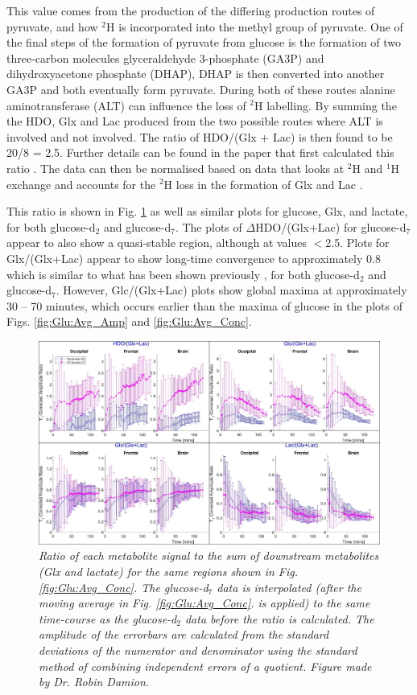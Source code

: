 This value comes from the production of the differing production routes of pyruvate, and how $^2$H is incorporated into the methyl group of pyruvate. One of the final steps of the formation of pyruvate from glucose is the formation of two three-carbon molecules glyceraldehyde 3-phosphate (GA3P) and dihydroxyacetone phosphate (DHAP), DHAP is then converted into another GA3P and both eventually form pyruvate. During both of these routes alanine aminotransferase (ALT) can influence the loss of $^2$H labelling. By summing the the \ac{HDO}, Glx and Lac produced from the two possible routes where ALT is involved and not involved. The ratio of HDO/(Glx + Lac) is then found to be 20/8 = 2.5. Further details can be found in the paper that first calculated this ratio \cite{Mahar2021DeuteratedGlucose}. The data can then be normalised based on data that looks at $^2$H and $^1$H exchange and accounts for the $^2$H loss in the formation of Glx and Lac \cite{DeGraaf2021CharacterizationStudies}.

This ratio is shown in Fig. \ref{fig:Glu:HDO_Rat} as well as similar plots for glucose, Glx, and lactate, for both glucose-d$_2$ and glucose-d$_7$. The plots of $\Delta$HDO/(Glx+Lac) for glucose-d$_7$ appear to also show a quasi-stable region, although at values $<$2.5. Plots for Glx/(Glx+Lac) appear to show long-time convergence to approximately 0.8 which is similar to what has been shown previously \cite{Kaggie2022DeuteriumMetabolism}, for both glucose-d$_2$ and glucose-d$_7$. However, Glc/(Glx+Lac) plots show global maxima at approximately 30 – 70 minutes, which occurs earlier than the maxima of glucose in the plots of Figs. \ref{fig:Glu:Avg_Amp} and \ref{fig:Glu:Avg_Conc}.  

\begin{figure}
    \centering
    \includegraphics[width = 1\textwidth]{Figures/Glucose/HDO_Ratio.png}
    \caption{\textit{Ratio of each metabolite signal to the sum of downstream metabolites (Glx and lactate) for the same regions shown in Fig. \ref{fig:Glu:Avg_Conc}. The glucose-d$_7$ data is interpolated (after the moving average in Fig. \ref{fig:Glu:Avg_Conc}. is applied) to the same time-course as the glucose-d$_2$ data before the ratio is calculated. The amplitude of the errorbars are calculated from the standard deviations of the numerator and denominator using the standard method of combining independent errors of a quotient. Figure made by Dr. Robin Damion.}}
    \label{fig:Glu:HDO_Rat}
\end{figure}

